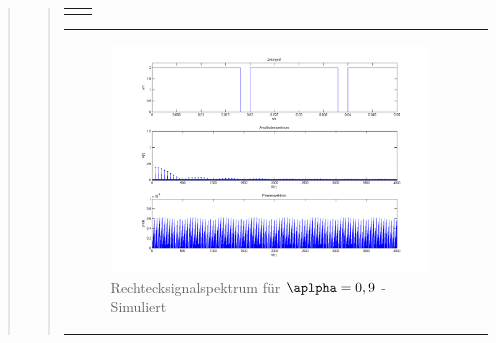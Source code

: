 \begin{quote}
\begin{quote}
\begin{center}
\begin{tabular}{ll}
\begin{minipage}{0.6\textwidth}
                \end{minipage}

            \end{tabular}
            \end{center}

            \begin{center}
            \begin{tabular}{ll}

            \hspace{-12em}
                \begin{minipage}{0.6\textwidth}

                    \begin{figure}[H]
                        \label{fig:}
                        \includegraphics[scale=0.25]{./Bilder/recht_alpha9.png} %
                        \caption{Rechtecksignalspektrum für $\aplpha = 0,9$ - Simuliert}
                    \end{figure}

                \end{minipage}
                \begin{minipage}{0.6\textwidth}


\end{minipage}
\end{tabular}
\end{center}
\end{quote}
\end{quote}
